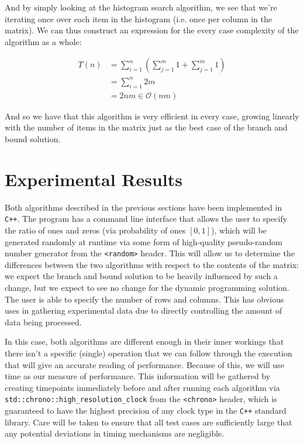 \documentclass{article}
\begin{document}
And by simply looking at the histogram search algorithm, we see that we're iterating once over each item in the histogram (i.e. once per column in the matrix).
We can thus construct an expression for the every case complexity of the algorithm as a whole:

\begin{align}
T(n) &= \sum_{i=1}^n {\left( \sum_{j=1}^m {1} + \sum_{j=1}^m {1} \right)} \\
&=  \sum_{i=1}^n {2m} \\
&= 2nm \in \mathcal{O}(nm)
\end{align}

And so we have that this algorithm is very efficient in every case, growing linearly with the number of items in the matrix just as the best case of the branch and bound solution.

\pagebreak
\section{Experimental Results}

Both algorithms described in the previous sections have been implemented in \texttt{C++}.
The program has a command line interface that allows the user to specify the ratio of ones and zeros (via probability of ones $[0, 1]$), which will be generated randomly at runtime via some form of high-quality pseudo-random number generator from the \texttt{<random>} header.
This will allow us to determine the differences between the two algorithms with respect to the contents of the matrix:
we expect the branch and bound solution to be heavily influenced by such a change,
but we expect to see no change for the dynamic programming solution.
The user is able to specify the number of rows and columns.
This has obvious uses in gathering experimental data due to directly controlling the amount of data being processed.

In this case, both algorithms are different enough in their inner workings that there isn't a specific (single) operation that we can follow through the execution that will give an accurate reading of performance.
Because of this, we will use time as our measure of performance.
This information will be gathered by creating timepoints immediately before and after running each algorithm via \texttt{std::chrono::high_resolution_clock} from the \texttt{<chrono>} header, which is guaranteed to have the highest precision of any clock type in the \texttt{C++} standard library.
Care will be taken to ensure that all test cases are sufficiently large that any potential deviations in timing mechanisms are negligible.
\end{document}
